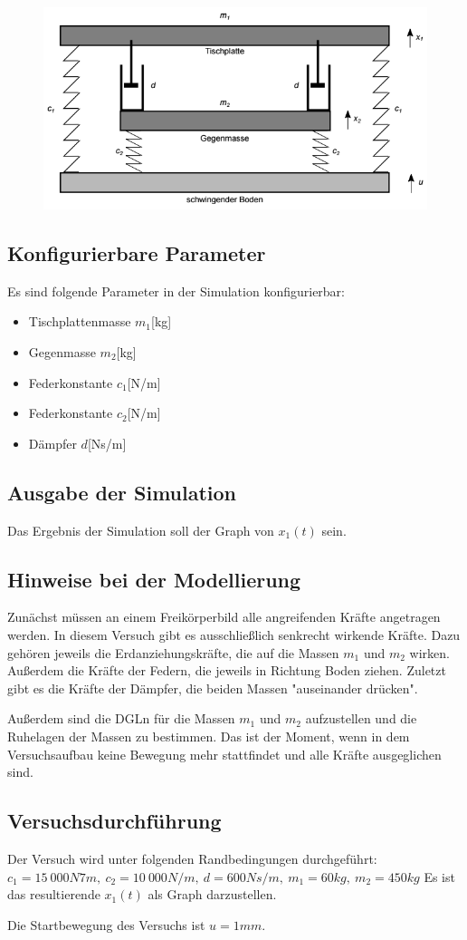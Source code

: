 \documentclass[]{scrartcl}
\begin{document}
\begin{figure}[H]
\centering
\includegraphics[width=0.5\linewidth]{./4_Versuchsaufbau}
\caption{}
\label{fig:4_Versuchsaufbau}
\end{figure}

\subsection{Konfigurierbare Parameter}
Es sind folgende Parameter in der Simulation konfigurierbar:
\begin{itemize}
\item Tischplattenmasse $m_{1}$[kg]
\item Gegenmasse $m_{2}$[kg]
\item Federkonstante $c_{1}$[N/m]
\item Federkonstante $c_{2}$[N/m]
\item Dämpfer $d$[Ns/m]
\end{itemize}

\subsection{Ausgabe der Simulation}
Das Ergebnis der Simulation soll der Graph von $x_{1}(t)$ sein.

\subsection{Hinweise bei der Modellierung}
Zunächst müssen an einem Freikörperbild alle angreifenden Kräfte angetragen werden. In diesem Versuch gibt es ausschließlich senkrecht wirkende Kräfte. Dazu gehören jeweils die Erdanziehungskräfte, die auf die Massen $m_{1}$ und $m_{2}$ wirken. Außerdem die Kräfte der Federn, die jeweils in Richtung Boden ziehen. Zuletzt gibt es die Kräfte der Dämpfer, die beiden Massen "auseinander drücken".

Außerdem sind die DGLn für die Massen $m_{1}$ und $m_{2}$ aufzustellen und die Ruhelagen der Massen zu bestimmen. Das ist der Moment, wenn in dem Versuchsaufbau keine Bewegung mehr stattfindet und alle Kräfte ausgeglichen sind.

\subsection{Versuchsdurchführung}
Der Versuch wird unter folgenden Randbedingungen durchgeführt: $c_{1} = 15\ 000N7m,\ c_{2}=10\ 000N/m,\ d=600Ns/m,\ m_{1}=60kg,\ m_{2}=450kg$
Es ist das resultierende $x_{1}(t)$ als Graph darzustellen.

Die Startbewegung des Versuchs ist $u=1mm$.
\end{document}
